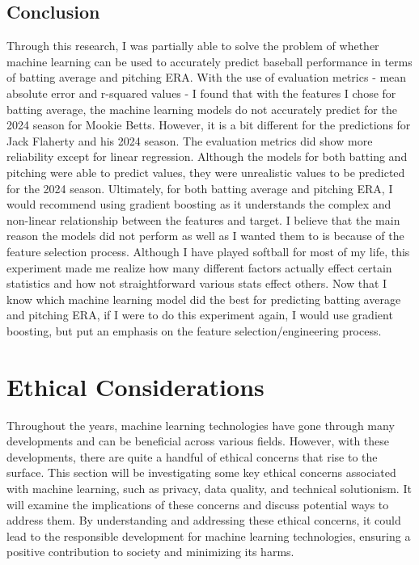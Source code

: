 \documentclass[10pt,twocolumn]{article}
\begin{document}
\subsection{Conclusion}
Through this research, I was partially able to solve the problem of whether machine learning can be used to accurately predict baseball performance in terms of batting average and pitching ERA. With the use of evaluation metrics - mean absolute error and r-squared values - I found that with the features I chose for batting average, the machine learning models do not accurately predict for the 2024 season for Mookie Betts. However, it is a bit different for the predictions for Jack Flaherty and his 2024 season. The evaluation metrics did show more reliability except for linear regression. Although the models for both batting and pitching were able to predict values, they were unrealistic values to be predicted for the 2024 season. Ultimately, for both batting average and pitching ERA, I would recommend using gradient boosting as it understands the complex and non-linear relationship between the features and target. I believe that the main reason the models did not perform as well as I wanted them to is because of the feature selection process. Although I have played softball for most of my life, this experiment made me realize how many different factors actually effect certain statistics and how not straightforward various stats effect others. Now that I know which machine learning model did the best for predicting batting average and pitching ERA, if I were to do this experiment again, I would use gradient boosting, but put an emphasis on the feature selection/engineering process.  

\section{Ethical Considerations}
Throughout the years, machine learning technologies have gone through many developments and can be beneficial across various fields. However, with these developments, there are quite a handful of ethical concerns that rise to the surface. This section will be investigating some key ethical concerns associated with machine learning, such as privacy, data quality, and technical solutionism. It will examine the implications of these concerns and discuss potential ways to address them. By understanding and addressing these ethical concerns, it could lead to the responsible development for machine learning technologies, ensuring a positive contribution to society and minimizing its harms. 
\end{document}
